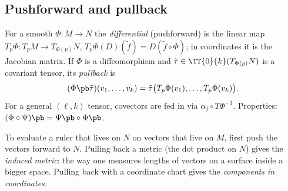 \subsection{Pushforward and pullback}\label{sec:pushpull}
\begin{formal}
For a smooth $\Phi:M\to N$ the \emph{differential} (pushforward) is the linear map $T_p\Phi:T_pM\to T_{\Phi(p)}N$, $T_p\Phi(D)(\tilde f)=D(\tilde f\circ\Phi)$; in coordinates it is the Jacobian matrix. If $\Phi$ is a diffeomorphism and $\tilde\tau\in\TT{0}{k}(T_{\Phi(p)}N)$ is a covariant tensor, its \emph{pullback} is
\[
(\Phi\pb\tilde\tau)(v_1,\dots,v_k)=\tilde\tau\big(T_p\Phi(v_1),\dots,T_p\Phi(v_k)\big).
\]
For a general $(\ell,k)$ tensor, covectors are fed in via $\alpha_j\circ T\Phi^{-1}$. Properties: $(\Phi\circ\Psi)\pb=\Psi\pb\circ\Phi\pb$.
\end{formal}
\begin{intuition}[{pullback = ``transport the measuring device backwards''}]
To evaluate a ruler that lives on $N$ on vectors that live on $M$, first push the vectors forward to $N$. Pulling back a metric (the dot product on $N$) gives the \emph{induced metric}: the way one measures lengths of vectors on a surface inside a bigger space. Pulling back with a coordinate chart gives the \emph{components in coordinates}.
\end{intuition}

